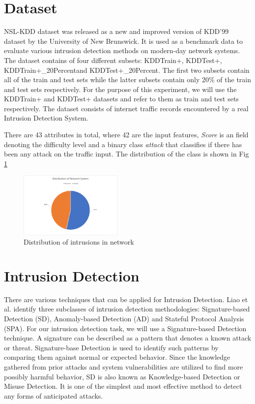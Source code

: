 \documentclass[conference]{IEEEtran}
\begin{document}
\section{Dataset}
NSL-KDD dataset was released as a new and improved version of KDD'99 dataset by the University of New Brunswick. It is used as a benchmark data to evaluate various intrusion detection methods on modern-day network systems.
The dataset contains of four different subsets: KDDTrain+, KDDTest+, KDDTrain+\_20Percentand KDDTest+\_20Percent. The first two subsets contain all of the train and test sets while the latter subsets contain only 20\% of the train and test sets respectively.
For the purpose of this experiment, we will use the KDDTrain+ and KDDTest+ datasets and refer to them as train and test sets respectively.
The dataset consists of internet traffic records encountered by a real Intrusion Detection System.

There are 43 attributes in total, where 42 are the input features, \emph{Score} is an field denoting the difficulty level and a binary class \emph{attack} that classifies if there has been any attack on the traffic input. The distribution of the class is shown in Fig \ref{fig1}

\begin{figure}[htbp]
\centerline{\includegraphics[height= 160 pt, width=0.45\textwidth]{External/Fig-Distribution-of-Network.PNG}}
\caption{Distribution of intrusions in network}
\label{fig1}
\end{figure}

\section{Intrusion Detection}
There are various techniques that can be applied for Intrusion Detection. Liao et al. \cite{b2} identify three subclasses of intrusion detection methodologies: Signature-based Detection (SD), Anomaly-based Detection (AD) and Stateful Protocol Analysis (SPA). For our intrusion detection task, we will use a Signature-based Detection technique. A signature can be described as a pattern that denotes a known attack or threat. Signature-base Detection is used to identify such patterns by comparing them against normal or expected behavior. Since the knowledge gathered from prior attacks and system vulnerabilities are utilized to find more possibly harmful behavior, SD is also known as Knowledge-based Detection or Misuse Detection. It is one of the simplest and most effective method to detect any forms of anticipated attacks.
\end{document}
